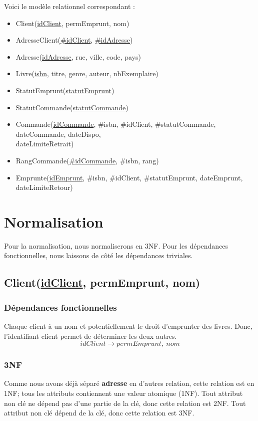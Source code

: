 \documentclass{article}
\begin{document}
Voici le modèle relationnel correspondant :
\begin{itemize}[label=$\bullet$]
\item Client(\underline{idClient}, permEmprunt, nom)
\item AdresseClient(\underline{\#idClient}, \underline{\#idAdresse})
\item Adresse(\underline{idAdresse}, rue, ville, code, pays)
\item Livre(\underline{isbn}, titre, genre, auteur, nbExemplaire)
\item StatutEmprunt(\underline{statutEmprunt})
\item StatutCommande(\underline{statutCommande})
\item Commande(\underline{idCommande}, \#isbn, \#idClient, \#statutCommande,
  dateCommande, dateDispo, \\
  dateLimiteRetrait)
\item RangCommande(\underline{\#idCommande}, \#isbn, rang)
\item Emprunte(\underline{idEmprunt}, \#isbn, \#idClient, \#statutEmprunt,
  dateEmprunt, dateLimiteRetour)
\end{itemize}

\section{Normalisation}
Pour la normalisation, nous normaliserons en 3NF. Pour les dépendances
fonctionnelles, nous laissons de côté les dépendances triviales.
\subsection{Client(\underline{idClient}, permEmprunt, nom)}
\subsubsection{Dépendances fonctionnelles}
Chaque client à un nom et potentiellement le droit d'emprunter des
livres. Donc, l'identifiant client permet de déterminer les deux autres.
$$idClient \rightarrow permEmprunt, \ nom$$

\subsubsection{3NF}
Comme nous avons déjà séparé \textbf{adresse} en d'autres relation, cette
relation est en 1NF; tous les attributs contiennent une valeur atomique (1NF).
Tout attribut non clé ne dépend pas d'une partie de la clé, donc cette relation
est 2NF. Tout attribut non clé dépend de la clé, donc cette relation est
3NF.
\end{document}
